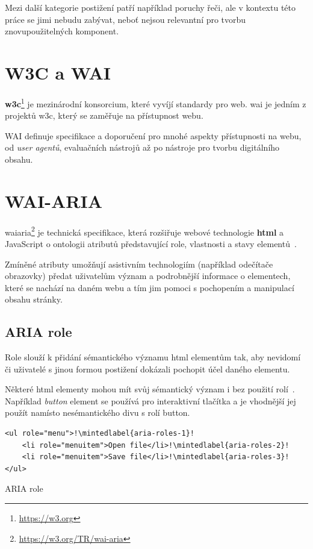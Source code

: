 Mezi další kategorie postižení patří například poruchy řeči, ale v kontextu této práce se jimi nebudu zabývat, neboť nejsou relevantní pro tvorbu znovupoužitelných komponent.

\section{W3C a WAI}

\textbf{\gls{w3c}}\footnote{\url{https://w3.org}} je mezinárodní konsorcium, které vyvíjí standardy pro web.
\gls{wai} je jedním z projektů \gls{w3c}, který se zaměřuje na přístupnost webu.

WAI definuje specifikace a doporučení pro mnohé aspekty přístupnosti na webu, od \textit{user agentů}, evaluačních nástrojů až po nástroje pro tvorbu digitálního obsahu.

\section{WAI-ARIA}

\gls{waiaria}\footnote{\url{https://w3.org/TR/wai-aria}} je technická specifikace, která rozšiřuje webové technologie \textbf{\gls{html}} a JavaScript o ontologii atributů představující role, vlastnosti a stavy elementů~\cite{wai-aria}.

Zmíněné atributy umožňují asistivním technologiím (například odečítače obrazovky) předat uživatelům význam a podrobnější informace o elementech, které se nachází na daném webu a tím jim pomoci s pochopením a manipulací obsahu stránky.

\subsection{ARIA role}

Role slouží k přidání sémantického významu \gls{html} elementům tak, aby nevidomí či uživatelé s jinou formou postižení dokázali pochopit účel daného elementu.

Některé \gls{html} elementy mohou mít svůj sémantický význam i bez použití rolí~\cite{wai-implicit-semantics}.
Například \textit{button} element se používá pro interaktivní tlačítka a je vhodnější jej použít namísto nesémantického divu s rolí button.

\clearpage

\begin{listing}[!ht]
    \begin{verbatim}
<ul role="menu">!\mintedlabel{aria-roles-1}!
    <li role="menuitem">Open file</li>!\mintedlabel{aria-roles-2}!
    <li role="menuitem">Save file</li>!\mintedlabel{aria-roles-3}!
</ul>
\end{verbatim}
    \caption{ARIA role}
    \label{aria-roles}
\end{listing}

